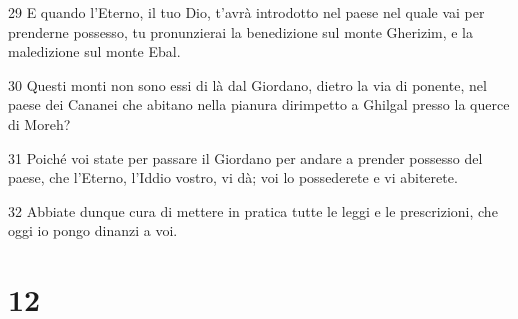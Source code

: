 \par 29 E quando l'Eterno, il tuo Dio, t'avrà introdotto nel paese nel quale vai per prenderne possesso, tu pronunzierai la benedizione sul monte Gherizim, e la maledizione sul monte Ebal.
\par 30 Questi monti non sono essi di là dal Giordano, dietro la via di ponente, nel paese dei Cananei che abitano nella pianura dirimpetto a Ghilgal presso la querce di Moreh?
\par 31 Poiché voi state per passare il Giordano per andare a prender possesso del paese, che l'Eterno, l'Iddio vostro, vi dà; voi lo possederete e vi abiterete.
\par 32 Abbiate dunque cura di mettere in pratica tutte le leggi e le prescrizioni, che oggi io pongo dinanzi a voi.

\chapter{12}

